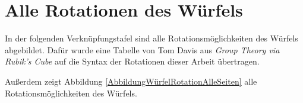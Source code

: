 \documentclass[12pt,a4paper, usenames, dvipsnames]{article}
\theoremstyle{mystyle}
\theoremstyle{definition}
\begin{document}
%
%
%
%
%
%
%
%
%
%
%
%
%
%
%
%
%
%
%

\newpage


\begin{spacing}{0.8}
\listoffigures
\end{spacing}

%
%
%
%
%
%
%
%
%
%
%
%
%
%
%
%
%
%

\newpage

\begin{singlespacing}
\printbibliography
\end{singlespacing}


%
%
%
%
%
%
%
%
%
%
%
%
%
%
%
%
%
%
%
\newpage
\appendix

\section{Alle Rotationen des Würfels}
\label{Anhang_RotationenDesWürfels}

In der folgenden Verknüpfungstafel sind alle Rotationsmöglichkeiten des Würfels abgebildet. Dafür wurde eine Tabelle von Tom Davis aus \textit{Group Theory via Rubik's Cube} \cite{TD} auf die Syntax der Rotationen dieser Arbeit übertragen.

Außerdem zeigt Abbildung \ref{AbbildungWürfelRotationAlleSeiten} alle Rotationsmöglichkeiten des Würfels.
\end{document}
